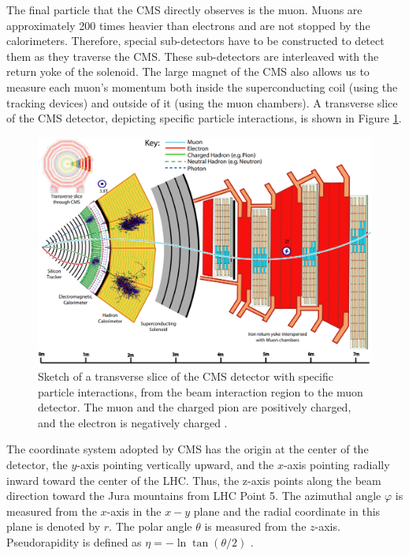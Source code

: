 The final particle that the CMS directly observes is the muon. Muons are approximately 200 times heavier than electrons and are not stopped by the calorimeters. Therefore, special sub-detectors have to be constructed to detect them as they traverse the CMS. These sub-detectors are interleaved with the return yoke of the solenoid. The large magnet of the CMS also allows us to measure each muon's momentum both inside the superconducting coil (using the tracking devices) and outside of it (using the muon chambers). A transverse slice of the CMS detector, depicting specific particle interactions, is shown in Figure \ref{slice_CMS}.


\begin{center}
  \begin{figure}[ht]
    \centering
    \includegraphics[scale=.3]{Chapter2/slice_det.png}
    \caption[Transverse slice fo CMS detector]{Sketch of a transverse slice of the CMS detector with specific particle interactions, from the beam interaction region to the muon detector. The muon and the charged pion are positively charged, and the electron is negatively charged \cite{det_summary}.}
    \label{slice_CMS}
  \end{figure}
\end{center}

The coordinate system adopted by CMS has the origin at the center of the detector, the $y$-axis pointing vertically upward, and the $x$-axis pointing radially inward toward the center of the LHC. Thus, the z-axis points along the beam direction toward the Jura mountains from LHC Point 5. The azimuthal angle $\varphi$ is measured from the $x$-axis in the $x-y$ plane and the radial coordinate in this plane is denoted by $r$. The polar angle $\theta$ is measured from the $z$-axis. Pseudorapidity is defined as $\eta=- \ln \tan (\theta/2)$ \cite{CMS_Exp_2008}.\\

